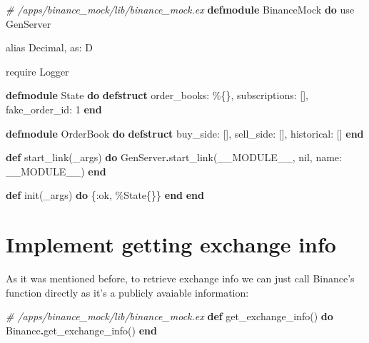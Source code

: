 \documentclass[
  oneside]{book}
\newenvironment{Shaded}{\begin{snugshade}}{\end{snugshade}}
\newcommand{\CommentTok}[1]{\textcolor[rgb]{0.56,0.35,0.01}{\textit{#1}}}
\newcommand{\ConstantTok}[1]{\textcolor[rgb]{0.00,0.00,0.00}{#1}}
\newcommand{\DecValTok}[1]{\textcolor[rgb]{0.00,0.00,0.81}{#1}}
\newcommand{\ImportTok}[1]{#1}
\newcommand{\KeywordTok}[1]{\textcolor[rgb]{0.13,0.29,0.53}{\textbf{#1}}}
\newcommand{\NormalTok}[1]{#1}
\newcommand{\OperatorTok}[1]{\textcolor[rgb]{0.81,0.36,0.00}{\textbf{#1}}}
\newcommand{\VariableTok}[1]{\textcolor[rgb]{0.00,0.00,0.00}{#1}}
\begin{document}
\begin{Shaded}
\begin{Highlighting}[]
\CommentTok{\# /apps/binance\_mock/lib/binance\_mock.ex}
\KeywordTok{defmodule} \ConstantTok{BinanceMock} \KeywordTok{do}
  \ImportTok{use} \ConstantTok{GenServer}

  \ImportTok{alias} \ConstantTok{Decimal}\NormalTok{, }\VariableTok{as:}\NormalTok{ D}

  \ImportTok{require} \ConstantTok{Logger}

  \KeywordTok{defmodule} \ConstantTok{State} \KeywordTok{do}
    \KeywordTok{defstruct} \VariableTok{order\_books:}\NormalTok{ \%\{\}, }\VariableTok{subscriptions:}\NormalTok{ [], }\VariableTok{fake\_order\_id:} \DecValTok{1}
  \KeywordTok{end}

  \KeywordTok{defmodule} \ConstantTok{OrderBook} \KeywordTok{do}
    \KeywordTok{defstruct} \VariableTok{buy\_side:}\NormalTok{ [], }\VariableTok{sell\_side:}\NormalTok{ [], }\VariableTok{historical:}\NormalTok{ []}
  \KeywordTok{end}  

  \KeywordTok{def}\NormalTok{ start\_link(\_args) }\KeywordTok{do}
    \ConstantTok{GenServer}\OperatorTok{.}\NormalTok{start\_link(}\ConstantTok{\_\_MODULE\_\_}\NormalTok{, }\ConstantTok{nil}\NormalTok{, }\VariableTok{name:} \ConstantTok{\_\_MODULE\_\_}\NormalTok{)}
  \KeywordTok{end}

  \KeywordTok{def}\NormalTok{ init(\_args) }\KeywordTok{do}
\NormalTok{    \{}\VariableTok{:ok}\NormalTok{, \%}\ConstantTok{State}\NormalTok{\{\}\}}
  \KeywordTok{end}
\KeywordTok{end}
\end{Highlighting}
\end{Shaded}

\hypertarget{implement-getting-exchange-info}{%
\section{Implement getting exchange info}\label{implement-getting-exchange-info}}

As it was mentioned before, to retrieve exchange info we can just call Binance's function directly as it's a publicly avaiable information:

\begin{Shaded}
\begin{Highlighting}[]
\CommentTok{\# /apps/binance\_mock/lib/binance\_mock.ex}
  \KeywordTok{def}\NormalTok{ get\_exchange\_info() }\KeywordTok{do}
    \ConstantTok{Binance}\OperatorTok{.}\NormalTok{get\_exchange\_info()}
  \KeywordTok{end}
\end{Highlighting}
\end{Shaded}
\end{document}
